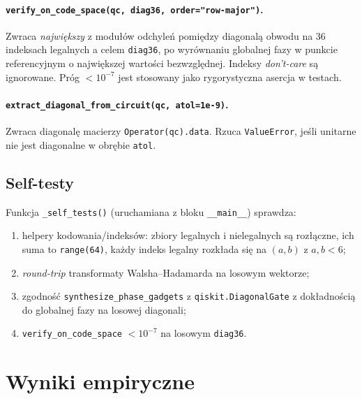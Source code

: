 \documentclass[11pt,a4paper]{article}
\newcommand{\1}{\mathbf{1}}
\newcommand{\code}[1]{\texttt{#1}}
\begin{document}
\paragraph{\texttt{verify\_on\_code\_space(qc, diag36, order="row-major")}.}
Zwraca \emph{największy} z modułów odchyleń pomiędzy diagonalą obwodu na
36 indeksach legalnych a celem \code{diag36}, po wyrównaniu globalnej
fazy w punkcie referencyjnym o największej wartości bezwzględnej.
Indeksy \emph{don't-care} są ignorowane. Próg
$<10^{-7}$ jest stosowany jako rygorystyczna asercja w testach.

\paragraph{\texttt{extract\_diagonal\_from\_circuit(qc, atol=1e-9)}.}
Zwraca diagonalę macierzy \code{Operator(qc).data}. Rzuca
\code{ValueError}, jeśli unitarne nie jest diagonalne w obrębie
\code{atol}.

\subsection{Self-testy}
\label{sec:tests}

Funkcja \code{\_self\_tests()} (uruchamiana z bloku \code{\_\_main\_\_})
sprawdza:
\begin{enumerate}[leftmargin=*]
  \item helpery kodowania/indeksów: zbiory legalnych i nielegalnych
        są rozłączne, ich suma to \code{range(64)}, każdy indeks
        legalny rozkłada się na $(a,b)$ z $a,b<6$;
  \item \emph{round-trip} transformaty Walsha--Hadamarda na losowym
        wektorze;
  \item zgodność \code{synthesize\_phase\_gadgets} z
        \code{qiskit.DiagonalGate} z dokładnością do globalnej fazy
        na losowej diagonali;
  \item \code{verify\_on\_code\_space} $<10^{-7}$ na losowym
        \code{diag36}.
\end{enumerate}

\section{Wyniki empiryczne}
\label{sec:results}
\end{document}
